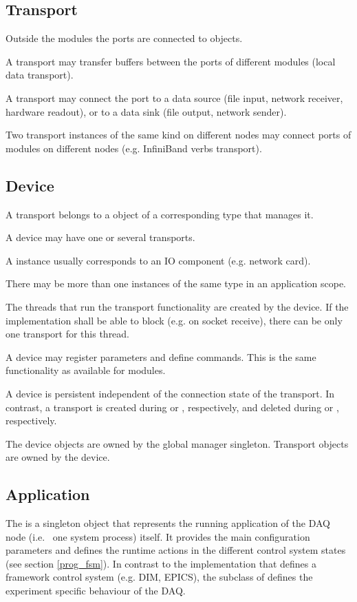\subsection{Transport}
Outside the modules the ports are connected to  objects.
\bcir
\item  A transport may transfer buffers between 
      the ports of different modules (local data transport).
\item  A transport may connect the port to a data 
      source (file input, network receiver, hardware readout), 
      or to a data sink (file output, network sender).
\item  Two transport instances of the same kind on 
      different nodes may connect ports of modules on 
      different nodes (e.g. InfiniBand verbs transport).
\ecir
\subsection{Device}
A transport belongs to a  object of a 
   corresponding type that manages it.
   
   
\bcir
\item  A device may have one or several transports.
\item  A  instance usually corresponds to an IO component (e.g. network card). 
\item  There may be more than one  instances of the same 
      type in an application scope. 
\item  The threads that run the transport functionality are 
      created by the device. If the  implementation 
      shall be able to block (e.g. on socket receive), there can be only 
      one transport for this thread. 
\item  A device may register parameters and define 
      commands. This is the same functionality as available for modules.   
\item  A device is persistent independent of the connection state 
      of the transport. In contrast, a transport is created 
      during  or , respectively,
      and deleted during  or , respectively. 
\item  The device objects are owned by the global manager 
      singleton. Transport objects are owned by the device.
\ecir

\subsection{Application}
The  is a singleton object that represents the running application of the DAQ node 
(i.e.~ one system process) itself. It provides the main configuration parameters
and defines the runtime actions in the different control system states (see section \ref{prog_fsm}).
In contrast to the  implementation that defines a framework control system (e.g. DIM, EPICS), the subclass of  defines the experiment specific behaviour of the DAQ.


